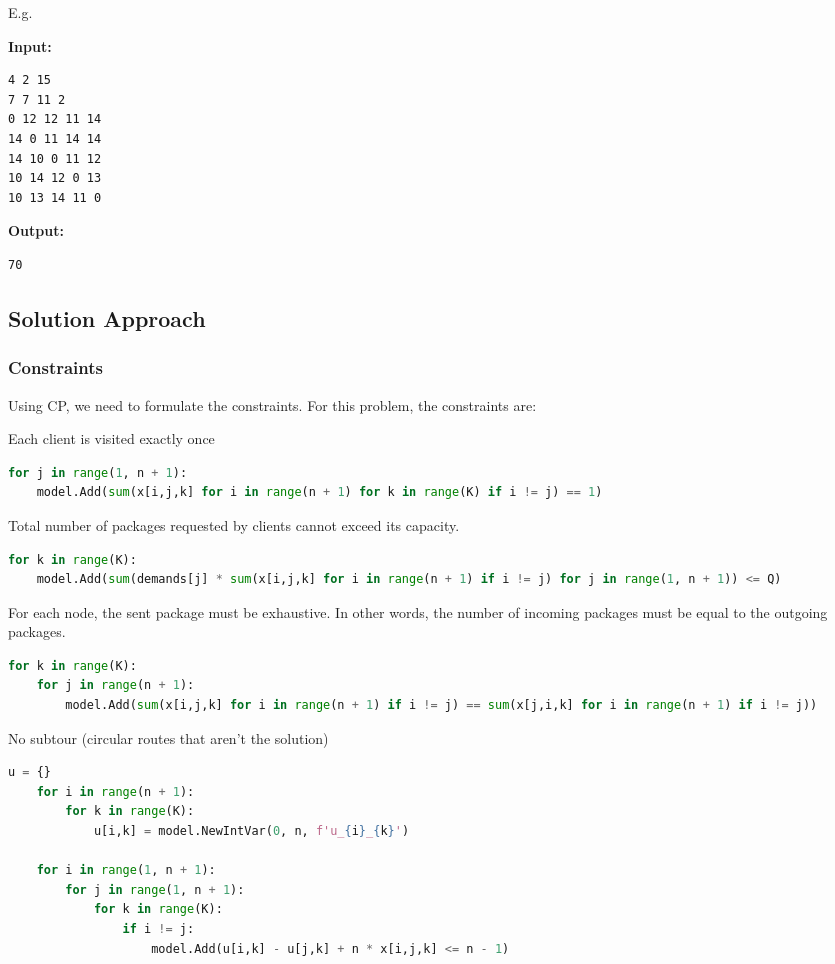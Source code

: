 \documentclass{article}
\begin{document}
E.g.

\begin{multicols}{2}
\textbf{Input:}
\begin{verbatim}
4 2 15
7 7 11 2
0 12 12 11 14
14 0 11 14 14
14 10 0 11 12
10 14 12 0 13
10 13 14 11 0
\end{verbatim}
\columnbreak
\textbf{Output:}
\begin{verbatim}
70
\end{verbatim}
\end{multicols}


\subsection{Solution Approach}
\subsubsection{Constraints}

Using CP, we need to formulate the constraints. For this problem, the constraints are:

Each client is visited exactly once
\pagebreak
\begin{lstlisting}[language=Python]
for j in range(1, n + 1):
    model.Add(sum(x[i,j,k] for i in range(n + 1) for k in range(K) if i != j) == 1)
\end{lstlisting}

Total number of packages requested by clients cannot exceed its capacity.
\begin{lstlisting}[language=Python]
for k in range(K):
    model.Add(sum(demands[j] * sum(x[i,j,k] for i in range(n + 1) if i != j) for j in range(1, n + 1)) <= Q)
\end{lstlisting}

For each node, the sent package must be exhaustive. In other words, the number of incoming packages must be equal to the outgoing packages.
\begin{lstlisting}[language=Python]
for k in range(K):
    for j in range(n + 1):
        model.Add(sum(x[i,j,k] for i in range(n + 1) if i != j) == sum(x[j,i,k] for i in range(n + 1) if i != j))
\end{lstlisting}

No subtour (circular routes that aren't the solution)
\begin{lstlisting}[language=Python]
    u = {}
    for i in range(n + 1):
        for k in range(K):
            u[i,k] = model.NewIntVar(0, n, f'u_{i}_{k}')
    
    for i in range(1, n + 1):
        for j in range(1, n + 1):
            for k in range(K):
                if i != j:
                    model.Add(u[i,k] - u[j,k] + n * x[i,j,k] <= n - 1)
\end{lstlisting}
\end{document}
